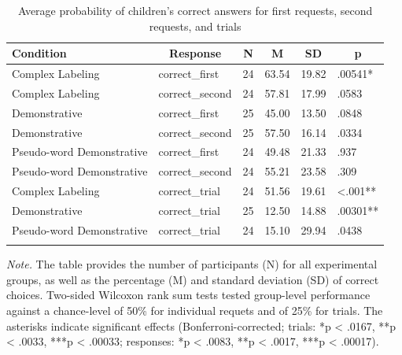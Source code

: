 \documentclass[
  man,floatsintext]{apa6}
\begin{document}
\begin{table}[ht]

\begin{center}
\begin{threeparttable}

\caption{\label{tab:randomchoicetab}Average probability of children's correct answers for first requests, second requests, and trials}

\footnotesize{

\begin{tabular}{llllll}
\toprule
Condition & \multicolumn{1}{c}{Response} & \multicolumn{1}{c}{N} & \multicolumn{1}{c}{M} & \multicolumn{1}{c}{SD} & \multicolumn{1}{c}{p}\\
\midrule
Complex Labeling & correct\_first & 24 & 63.54 & 19.82 & .00541*\\
Complex Labeling & correct\_second & 24 & 57.81 & 17.99 & .0583\\
Demonstrative & correct\_first & 25 & 45.00 & 13.50 & .0848\\
Demonstrative & correct\_second & 25 & 57.50 & 16.14 & .0334\\
Pseudo-word Demonstrative & correct\_first & 24 & 49.48 & 21.33 & .937\\
Pseudo-word Demonstrative & correct\_second & 24 & 55.21 & 23.58 & .309\\
Complex Labeling & correct\_trial & 24 & 51.56 & 19.61 & <.001**\\
Demonstrative & correct\_trial & 25 & 12.50 & 14.88 & .00301**\\
Pseudo-word Demonstrative & correct\_trial & 24 & 15.10 & 29.94 & .0438\\
\bottomrule
\addlinespace
\end{tabular}

}

\begin{tablenotes}[para]
\normalsize{\textit{Note.} The table provides the number of participants (N) for all experimental groups, as well as the percentage (M) and standard deviation (SD) of correct choices. Two-sided Wilcoxon rank sum tests tested group-level performance against a chance-level of 50\% for individual requets and of 25\% for trials. The asterisks indicate significant effects (Bonferroni-corrected; trials: *p < .0167, **p < .0033, ***p < .00033; responses: *p < .0083, **p < .0017, ***p < .00017).}
\end{tablenotes}

\end{threeparttable}
\end{center}

\end{table}
\end{document}
